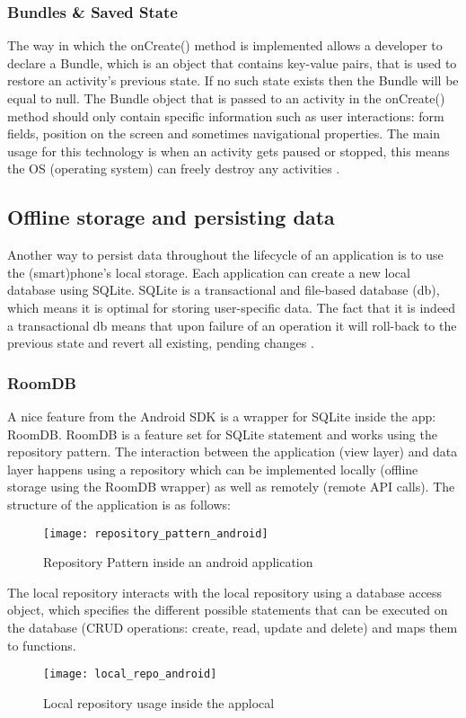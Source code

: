 \subsubsection{Bundles \& Saved State}
The way in which the onCreate() method is implemented allows a developer to declare a Bundle, which is an object that contains key-value pairs, that is used to restore an activity's previous state. If no such state exists then the Bundle will be equal to null. The Bundle object that is passed to an activity in the onCreate() method should only contain specific information such as user interactions: form fields, position on the screen and sometimes navigational properties. The main usage for this technology is when an activity gets paused or stopped, this means the OS (operating system) can freely destroy any activities \cite{JamesHalpern2012}.
\subsection{Offline storage and persisting data}
Another way to persist data throughout the lifecycle of an application is to use the (smart)phone's local storage. Each application can create a new local database using SQLite. SQLite is a transactional and file-based database (db), which means it is optimal for storing user-specific data. The fact that it is indeed a transactional db means that upon failure of an operation it will roll-back to the previous state and revert all existing, pending changes \cite{TutorialsPoint2019}.
\subsubsection{RoomDB}
A nice feature from the Android SDK is a wrapper for SQLite inside the app: RoomDB. RoomDB is a feature set for SQLite statement and works using the repository pattern. The interaction between the application (view layer) and data layer happens using a repository which can be implemented locally (offline storage using the RoomDB wrapper) as well as remotely (remote API calls). The structure of the application is as follows:
\begin{figure}[h!]
\texttt{[image: repository\_pattern\_android]}
\centering
\caption{Repository Pattern inside an android application~\cite{EslamHussein2018}}
\end{figure}
The local repository interacts with the local repository using a database access object, which specifies the different possible statements that can be executed on the database (CRUD operations: create, read, update and delete) and maps them to functions.
\begin{figure}[h!]
\texttt{[image: local\_repo\_android]}
\centering
\caption{Local repository usage inside the applocal~\cite{Unknown2018}}
\end{figure}

